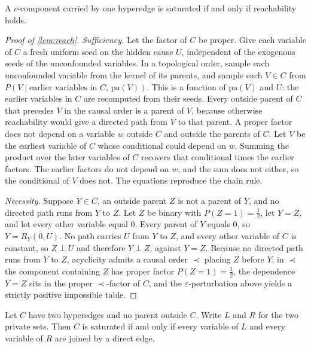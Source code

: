 \begin{lemma}
\label{lem:reach}
A $c$-component carried by one hyperedge is saturated if and only if reachability holds.
\end{lemma}

\begin{proof}[Proof of \cref{lem:reach}]
\emph{Sufficiency.} Let the factor of $C$ be proper. Give each variable of $C$ a fresh uniform seed on the hidden cause $U$, independent of the exogenous seeds of the unconfounded variables. In a topological order, sample each unconfounded variable from the kernel of its parents, and sample each $V\in C$ from $P(V\mid\text{earlier variables in }C,\,\mathrm{pa}(V))$. This is a function of $\mathrm{pa}(V)$ and $U$: the earlier variables in $C$ are recomputed from their seeds. Every outside parent of $C$ that precedes $V$ in the causal order is a parent of $V$, because otherwise reachability would give a directed path from $V$ to that parent. A proper factor does not depend on a variable $w$ outside $C$ and outside the parents of $C$. Let $V$ be the earliest variable of $C$ whose conditional could depend on $w$. Summing the product over the later variables of $C$ recovers that conditional times the earlier factors. The earlier factors do not depend on $w$, and the sum does not either, so the conditional of $V$ does not. The equations reproduce the chain rule.

\emph{Necessity.} Suppose $Y\in C$, an outside parent $Z$ is not a parent of $Y$, and no directed path runs from $Y$ to $Z$. Let $Z$ be binary with $P(Z{=}1)=\tfrac12$, let $Y=Z$, and let every other variable equal $0$. Every parent of $Y$ equals $0$, so $Y=R_Y(0,U)$. No path carries $U$ from $Y$ to $Z$, and every other variable of $C$ is constant, so $Z\perp U$ and therefore $Y\perp Z$, against $Y=Z$. Because no directed path runs from $Y$ to $Z$, acyclicity admits a causal order $\prec$ placing $Z$ before $Y$; in $\prec$ the component containing $Z$ has proper factor $P(Z{=}1)=\tfrac12$, the dependence $Y=Z$ sits in the proper $\prec$-factor of $C$, and the $\varepsilon$-perturbation above yields a strictly positive impossible table.
\end{proof}

\begin{lemma}
\label{lem:cross}
Let $C$ have two hyperedges and no parent outside $C$. Write $L$ and $R$ for the two private sets. Then $C$ is saturated if and only if every variable of $L$ and every variable of $R$ are joined by a direct edge.
\end{lemma}

